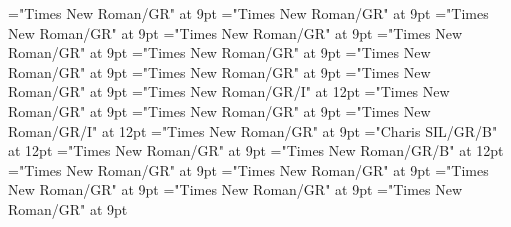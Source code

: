 \documentclass[gps1,twoside]{article}
\begin{document}
\font\spantranslationtranslationtranslationsexampleexamplessensesensessubentrysubentriesentrylastchildafter="Times New Roman/GR" at 9pt
\font\spanspanencyclopedicinfosensesensessubentrysubentriesentrybefore="Times New Roman/GR" at 9pt
\font\spanencyclopedicinfosensesensessubentrysubentriesentryfirstchildbefore="Times New Roman/GR" at 9pt
\font\spanencyclopedicinfosensesensessubentrysubentriesentrylastchildafter="Times New Roman/GR" at 9pt
\font\spanspanrestrictionssensesensessubentrysubentriesentrybefore="Times New Roman/GR" at 9pt
\font\spanrestrictionssensesensessubentrysubentriesentryfirstchildbefore="Times New Roman/GR" at 9pt
\font\spanrestrictionssensesensessubentrysubentriesentrylastchildafter="Times New Roman/GR" at 9pt
\font\spanspanlexsensereferencessensesensessubentrysubentriesentrybefore="Times New Roman/GR" at 9pt
\font\lexsensereferencessensesensessubentrysubentriesentryafter="Times New Roman/GR" at 9pt
\font\spanenownertypeabbreviationlexsensereferencelexsensereferencessensesensessubentrysubentriesentry="Times New Roman/GR/I" at 12pt
\font\spanspanownertypeabbreviationlexsensereferencelexsensereferencessensesensessubentrysubentriesentrybefore="Times New Roman/GR" at 9pt
\font\spanownertypeabbreviationlexsensereferencelexsensereferencessensesensessubentrysubentriesentrylastchildafter="Times New Roman/GR" at 9pt
\font\spanownertypeabbreviationlexsensereferencelexsensereferencessensesensessubentrysubentriesentry="Times New Roman/GR/I" at 12pt
\font\configtargetconfigtargetconfigtargetslexsensereferencelexsensereferencessensesensessubentrysubentriesentrybefore="Times New Roman/GR" at 9pt
\font\spanbzhheadwordconfigtargetconfigtargetslexsensereferencelexsensereferencessensesensessubentrysubentriesentry="Charis SIL/GR/B" at 12pt
\font\spanspanheadwordconfigtargetconfigtargetslexsensereferencelexsensereferencessensesensessubentrysubentriesentrybefore="Times New Roman/GR" at 9pt
\font\spanheadwordconfigtargetconfigtargetslexsensereferencelexsensereferencessensesensessubentrysubentriesentry="Times New Roman/GR/B" at 12pt
\font\variantformentrybackrefvariantformentrybackrefvariantformentrybackrefssensesensessubentrysubentriesentrybefore="Times New Roman/GR" at 9pt
\font\variantformentrybackrefssensesensessubentrysubentriesentrybefore="Times New Roman/GR" at 9pt
\font\variantformentrybackrefssensesensessubentrysubentriesentryafter="Times New Roman/GR" at 9pt
\font\variantentrytypevariantentrytypevariantentrytypesvariantformentrybackrefvariantformentrybackrefssensesensessubentrysubentriesentrybefore="Times New Roman/GR" at 9pt
\font\variantentrytypesvariantformentrybackrefvariantformentrybackrefssensesensessubentrysubentriesentryafter="Times New Roman/GR" at 9pt
\end{document}
